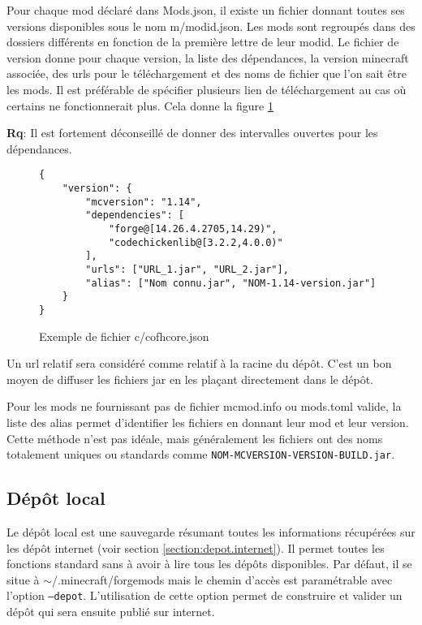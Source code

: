 \documentclass{article}
\newcommand{\remarque}[0]{\par\noindent\textbf{Rq}: }
\begin{document}
Pour chaque mod déclaré dans \textsf{Mods.json}, il existe un fichier donnant toutes ses versions disponibles sous le nom \textsf{m/modid.json}.
Les mods sont regroupés dans des dossiers différents en fonction de la première lettre de leur modid.
Le fichier de version donne pour chaque version, la liste des dépendances, la version minecraft associée, des urls pour le téléchargement et des noms de fichier que l'on sait être les mods.
Il est préférable de spécifier plusieurs lien de téléchargement au cas où certains ne fonctionnerait plus.
Cela donne la figure \ref{fig:cofhcore.json}

\remarque Il est fortement déconseillé de donner des intervalles ouvertes pour les dépendances.

\begin{figure}[h]
\begin{verbatim}
{
    "version": {
        "mcversion": "1.14",
        "dependencies": [
            "forge@[14.26.4.2705,14.29)",
            "codechickenlib@[3.2.2,4.0.0)"
        ],
        "urls": ["URL_1.jar", "URL_2.jar"],
        "alias": ["Nom connu.jar", "NOM-1.14-version.jar"]
    }
}
\end{verbatim}
\caption{Exemple de fichier \textsf{c/cofhcore.json}}
\label{fig:cofhcore.json}
\end{figure}

Un url relatif sera considéré comme relatif à la racine du dépôt.
C'est un bon moyen de diffuser les fichiers jar en les plaçant directement dans le dépôt.

Pour les mods ne fournissant pas de fichier \textsf{mcmod.info} ou \textsf{mods.toml} valide, la liste des alias permet d'identifier les fichiers en donnant leur mod et leur version.
Cette méthode n'est pas idéale, mais généralement les fichiers ont des noms totalement uniques ou standards comme \verb|NOM-MCVERSION-VERSION-BUILD.jar|.

\subsection{Dépôt local}
\label{section:depot.local}
Le dépôt local est une sauvegarde résumant toutes les informations récupérées sur les dépôt internet (voir section \ref{section:depot.internet}).
Il permet toutes les fonctions standard sans à avoir à lire tous les dépôts disponibles.
Par défaut, il se situe à \textsf{$\sim$/.minecraft/forgemods} mais le chemin d'accès est paramétrable avec l'option \texttt{--depot}.
L'utilisation de cette option permet de construire et valider un dépôt qui sera ensuite publié sur internet.
\end{document}
